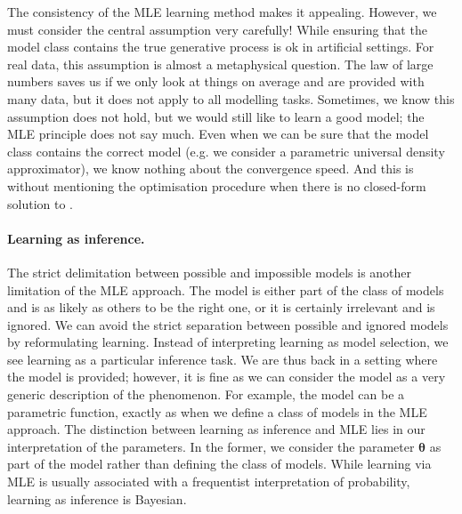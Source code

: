 The consistency of the MLE learning method makes it appealing. However, we must consider the central assumption very carefully! While ensuring that the model class contains the true generative process is ok in artificial settings. For real data, this assumption is almost a metaphysical question. The law of large numbers saves us if we only look at things on average and are provided with many data, but it does not apply to all modelling tasks. Sometimes, we know this assumption does not hold, but we would still like to learn a good model; the MLE principle does not say much. Even when we can be sure that the model class contains the correct model (e.g. we consider a parametric universal density approximator), we know nothing about the convergence speed. And this is without mentioning the optimisation procedure when there is no closed-form solution to .


\paragraph{Learning as inference.}
The strict delimitation between possible and impossible models is another limitation of the MLE approach. The model is either part of the class of models and is as likely as others to be the right one, or it is certainly irrelevant and is ignored. We can avoid the strict separation between possible and ignored models by reformulating learning. Instead of interpreting learning as model selection, we see learning as a particular inference task. We are thus back in a setting where the model is provided; however, it is fine as we can consider the model as a very generic description of the phenomenon. For example, the model can be a parametric function, exactly as when we define a class of models in the MLE approach. The distinction between learning as inference and MLE lies in our interpretation of the parameters. In the former, we consider the parameter $\bm \theta$ as part of the model rather than defining the class of models. While learning via MLE is usually associated with a frequentist interpretation of probability, learning as inference is Bayesian.

